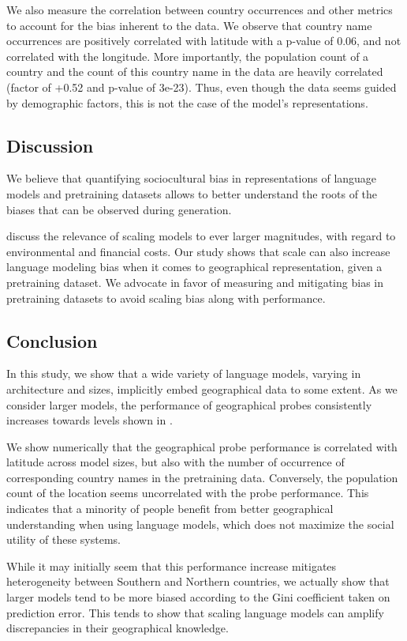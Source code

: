 We also measure the correlation between country occurrences and other metrics to account for the bias inherent to the data. We observe that country name occurrences are positively correlated with latitude with a p-value of 0.06, and not correlated with the longitude. More importantly, the population count of a country and the count of this country name in the data are heavily correlated (factor of +0.52 and p-value of 3e-23). Thus, even though the data seems guided by demographic factors, this is not the case of the model's representations.

\subsection{Discussion}
\label{sec:discussion}
We believe that quantifying sociocultural bias in representations of language models and pretraining datasets allows to better understand the roots of the biases that can be observed during generation.

\citet{parrots_bender} discuss the relevance of scaling models to ever larger magnitudes, with regard to environmental and financial costs. Our study shows that scale can also increase language modeling bias when it comes to geographical representation, given a pretraining dataset. We advocate in favor of measuring and mitigating bias in pretraining datasets to avoid scaling bias along with performance.

\subsection*{Conclusion}
In this study, we show that a wide variety of language models, varying in architecture and sizes, implicitly embed geographical data to some extent. As we consider larger models, the performance of geographical probes consistently increases towards levels shown in \citet{gurnee2023language}.

We show numerically that the geographical probe performance is correlated with latitude across model sizes, but also with the number of occurrence of corresponding country names in the pretraining data. Conversely, the population count of the location seems uncorrelated with the probe performance. This indicates that a minority of people benefit from better geographical understanding when using language models, which does not maximize the social utility of these systems.

While it may initially seem that this performance increase mitigates heterogeneity between Southern and Northern countries, we actually show that larger models tend to be more biased according to the Gini coefficient taken on prediction error. This tends to show that scaling language models can amplify discrepancies in their geographical knowledge.




